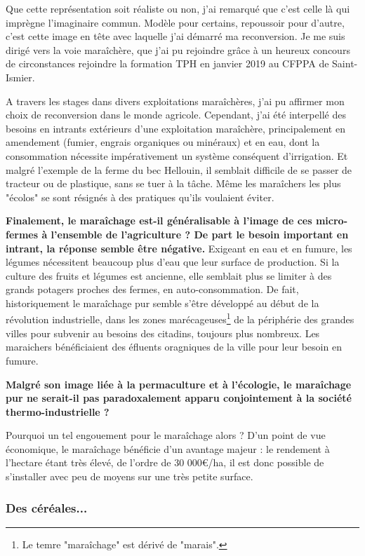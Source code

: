 \documentclass{book}
\begin{document}
Que cette représentation soit réaliste ou non, j'ai remarqué que c'est celle là qui imprègne l'imaginaire commun. Modèle pour certains, repoussoir pour d'autre, c'est  cette image en tête avec laquelle j'ai démarré ma reconversion. Je me suis dirigé vers la voie maraîchère, que j'ai pu rejoindre grâce à un heureux concours de circonstances rejoindre la formation TPH en janvier 2019 au CFPPA de Saint-Ismier. 

A travers les stages dans divers exploitations maraîchères, j'ai pu affirmer mon choix de reconversion dans le monde agricole. Cependant, j'ai été interpellé des besoins en intrants extérieurs d'une exploitation maraîchère, principalement en amendement (fumier, engrais organiques ou minéraux) et en eau, dont la consommation nécessite impérativement un système conséquent d'irrigation. Et malgré l'exemple de la ferme du bec Hellouin, il semblait difficile de se passer de tracteur ou de plastique, sans se tuer à la tâche. Même les maraîchers les plus "écolos" se sont résignés à des pratiques qu'ils voulaient éviter.

\textbf{Finalement, le maraîchage est-il généralisable à l'image de ces micro-fermes à l'ensemble de l'agriculture ? De part le besoin important en intrant, la réponse semble être négative.} Exigeant en eau et en fumure, les légumes nécessitent beaucoup plus d'eau que leur surface de production. Si la culture des fruits et légumes est ancienne, elle semblait plus se limiter à des grands potagers proches des fermes, en auto-consommation. De fait, historiquement le maraîchage pur semble s'être développé au début de la révolution industrielle, dans les zones marécageuses\footnote{Le temre "maraîchage" est dérivé de "marais".} de la périphérie des grandes villes pour subvenir au besoins des citadins, toujours plus nombreux. Les maraichers bénéficiaient des éfluents oragniques de la ville pour leur besoin en fumure. 

\textbf{Malgré son image liée à la permaculture et à l'écologie, le maraîchage pur ne serait-il pas paradoxalement apparu conjointement à la société thermo-industrielle ?}

Pourquoi un tel engouement pour le maraîchage alors ? D'un point de vue économique, le maraîchage bénéficie d'un avantage majeur : le rendement à l'hectare étant très élevé, de l'ordre de 30 000\euro{}/ha, il est donc possible de s'installer avec peu de moyens sur une très petite surface. 

\subsubsection{Des céréales...}
\end{document}
